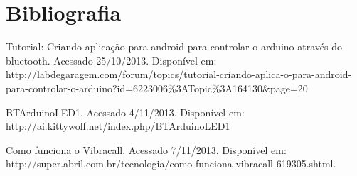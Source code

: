 \documentclass[portugues, brazil, a4paper,12pt]{article}
\begin{document}
\section{Bibliografia}
\begin{thebibliography}{100}

 Tutorial: Criando aplicação para android para controlar o arduino através do bluetooth. Acessado 25/10/2013. Disponível em: http://labdegaragem.com/forum/topics/tutorial-criando-aplica-o-para-android-para-controlar-o-arduino?id=6223006\%3ATopic\%3A164130\&page=20


 BTArduinoLED1. Acessado 4/11/2013. Disponível em: http://ai.kittywolf.net/index.php/BTArduinoLED1


 Como funciona o Vibracall. Acessado 7/11/2013. Disponível em: http://super.abril.com.br/tecnologia/como-funciona-vibracall-619305.shtml.

\end{thebibliography}
\end{document}
